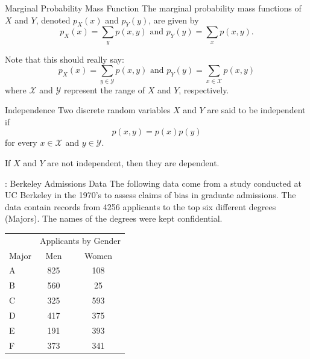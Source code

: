 \begin{frame}
  \begin{block}{Marginal Probability Mass Function}
    The marginal probability mass functions of $X$ and $Y$, denoted $p_X(x)$ and $p_Y(y)$, are given by
    \[
      p_X(x)=\sum_{y}p(x,y) \mbox{ and } p_Y(y)=\sum_xp(x,y).
    \]

    \bigskip

    Note that this should really say:
    \[
      p_X(x)=\sum_{y \in \mathcal{Y}}p(x,y) \mbox{ and } p_Y(y)=\sum_{x \in \mathcal{X}} p(x,y)
    \]
    where $\mathcal{X}$ and $\mathcal{Y}$ represent the range of $X$ and $Y$, respectively.
    
  \end{block}
\end{frame}

\begin{frame}
  \begin{block}{Independence}
    Two discrete random variables $X$ and $Y$ are said to be independent if
    \[
      p(x,y)=p(x)p(y)
    \]
    for every $x \in \mathcal{X}$ and $y \in \mathcal{Y}$. 
    
    \bigskip
    
    If $X$ and $Y$ are not independent, then they are dependent. 
  \end{block}
\end{frame}



\begin{frame}
  \begin{block}{\example: Berkeley Admissions Data}
    The following data come from a study conducted at UC Berkeley in the 1970's to assess claims of bias in graduate admissions. The data contain records from 4256 applicants to the top six different degrees (Majors). The names of the degrees were kept confidential.
    
    \begin{center}
      \begin{tabular}{lcc}
        & \multicolumn{2}{c}{Applicants by Gender}\\
        Major & Men & Women\\
        \hline
        A & 825 & 108\\
        B & 560 & 25\\
        C & 325 & 593\\
        D & 417 & 375\\
        E & 191 & 393\\
      F & 373 & 341\\
      \end{tabular}
    \end{center}
  \end{block}
\end{frame}

